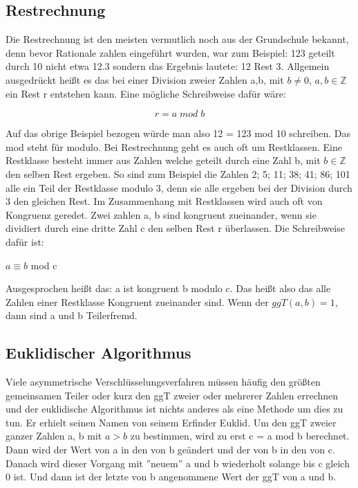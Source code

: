 \documentclass[a4paper,12pt,titlepage]{article}
\begin{document}
\subsection{Restrechnung}
Die Restrechnung ist den meisten vermutlich noch aus der Grundschule bekannt, denn bevor Rationale zahlen eingeführt wurden, war zum Beispiel: 123 geteilt durch 10 nicht etwa 12.3 sondern das Ergebnis lautete: 12 Rest 3. Allgemein ausgedrückt heißt es das bei einer Division zweier Zahlen a,b, mit $b \neq 0$, $a,b \in \mathbb{Z}$ ein Rest r entstehen kann. Eine mögliche Schreibweise dafür wäre: \newline
\begin{center}
\[r = a \; mod \; b\]
\end{center}
Auf das obrige Beispiel bezogen würde man also 12 = 123 mod 10 schreiben. Das mod steht für modulo.  \newline
Bei Restrechnung geht es auch oft um Restklassen. Eine Restklasse besteht immer aus Zahlen welche geteilt durch eine Zahl b, mit $b \in \mathbb{Z}$ den selben Rest ergeben. So sind zum Beispiel die Zahlen 2; 5; 11; 38; 41; 86; 101 alle ein Teil der Restklasse modulo 3, denn sie alle ergeben bei der Division durch 3 den gleichen Rest.
Im Zusammenhang mit Restklassen wird auch oft von Kongruenz geredet. Zwei zahlen a, b sind kongruent zueinander, wenn sie dividiert durch eine dritte Zahl c den selben Rest r überlassen. Die Schreibweise dafür ist: \newline
 \begin{center}
$a \equiv b$ mod c
 \end{center}
Ausgesprochen heißt das: a ist kongruent b modulo c. 
Das heißt also das alle Zahlen einer Restklasse Kongruent zueinander sind.
Wenn der $ggT(a, b) = 1$, dann sind a und b Teilerfremd.
 
\subsection{Euklidischer Algorithmus}
Viele asymmetrische Verschlüsselungsverfahren müssen häufig den größten gemeinsamen Teiler oder kurz den ggT zweier oder mehrerer Zahlen errechnen und der euklidische Algorithmus ist nichts anderes als eine Methode um dies zu tun. Er erhielt seinen Namen von seinem Erfinder Euklid.\newline
Um den ggT zweier ganzer Zahlen a, b mit $a > b$ zu bestimmen, wird zu erst c = a mod b berechnet. Dann wird der Wert von a in den von b geändert und der von b in den von c. Danach wird dieser Vorgang mit ''neuem'' a und b wiederholt solange bis c gleich 0 ist. Und dann ist der letzte von b angenommene Wert der ggT von a und b.
\end{document}
